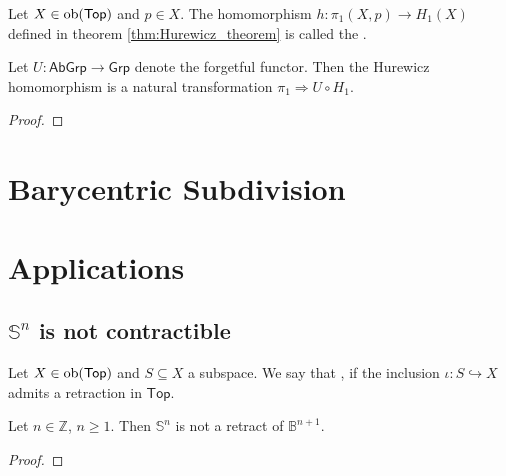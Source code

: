 \begin{definition}
	Let $X \in \operatorname{ob}(\mathsf{Top})$ and $p \in X$. The homomorphism $h : \pi_1(X,p) \to H_1(X)$ defined in theorem \ref{thm:Hurewicz_theorem} is called the .
\end{definition}

\begin{proposition}
	Let $U : \mathsf{AbGrp} \to \mathsf{Grp}$ denote the forgetful functor. Then the Hurewicz homomorphism is a natural transformation $\pi_1 \Rightarrow U \circ H_1$.
\end{proposition}

\begin{proof}
	
\end{proof}

\section*{Barycentric Subdivision}



\section*{Applications}
\subsection*{$\mathbb{S}^n$ is not contractible}

\begin{definition}[Retract]
	Let $X \in \operatorname{ob}(\mathsf{Top})$ and $S \subseteq X$ a subspace. We say that ,  if the inclusion $\iota : S \hookrightarrow X$ admits a retraction in $\mathsf{Top}$.
\end{definition}

\begin{lemma}
	Let $n \in \mathbb{Z}$, $n \geq 1$. Then $\mathbb{S}^n$ is not a retract of $\mathbb{B}^{n + 1}$. 	
\end{lemma}

\begin{proof}
	
\end{proof}

